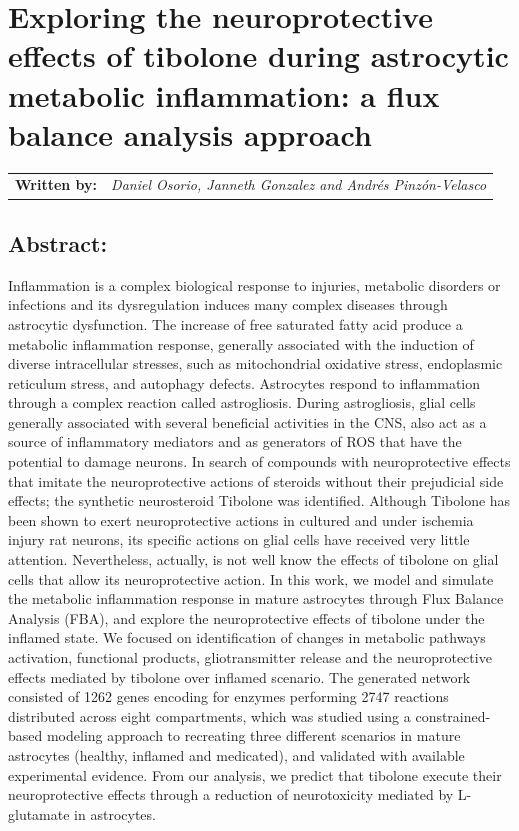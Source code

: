 \chapter{Exploring the neuroprotective effects of tibolone during astrocytic metabolic inflammation: a flux balance analysis approach}
\begin{tabular}{rm{12cm}}
\textsf{\textbf{Written by:}} & \textit{Daniel Osorio, Janneth Gonzalez and Andrés Pinzón-Velasco}\\ 
\end{tabular}
\section*{Abstract:}
Inflammation is a complex biological response to injuries, metabolic disorders or infections and its dysregulation induces many complex diseases through astrocytic dysfunction. The increase of free saturated fatty acid produce a metabolic inflammation response, generally associated with the induction of diverse intracellular stresses, such as mitochondrial oxidative stress, endoplasmic reticulum stress, and autophagy defects.  Astrocytes respond to inflammation through a complex reaction called astrogliosis. During astrogliosis, glial cells generally associated with several beneficial activities in the CNS, also act as a source of inflammatory mediators and as generators of ROS that have the potential to damage neurons. In search of compounds with neuroprotective effects that imitate the neuroprotective actions of steroids without their prejudicial side effects; the synthetic neurosteroid Tibolone was identified. Although Tibolone has been shown to exert neuroprotective actions in cultured and under ischemia injury rat neurons, its specific actions on glial cells have received very little attention. Nevertheless, actually, is not well know the effects of tibolone on glial cells that allow its neuroprotective action. In this work, we model and simulate the metabolic inflammation response in mature astrocytes through Flux Balance Analysis (FBA), and explore the neuroprotective effects of tibolone under the inflamed state. We focused on identification of changes in metabolic pathways activation, functional products, gliotransmitter release and the neuroprotective effects mediated by tibolone over inflamed scenario. The generated network consisted of 1262 genes encoding for enzymes performing 2747 reactions distributed across eight compartments, which was studied using a constrained-based modeling approach to recreating three different scenarios in mature astrocytes (healthy, inflamed and medicated), and validated with available experimental evidence. From our analysis, we predict that tibolone execute their neuroprotective effects through a reduction of neurotoxicity mediated by L-glutamate in astrocytes.
